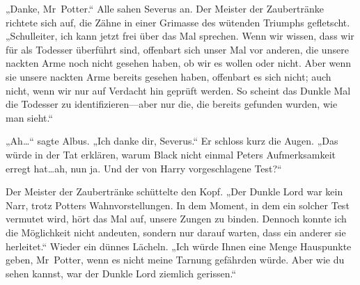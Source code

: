 „Danke, Mr~Potter.“ Alle sahen Severus an. Der Meister der Zaubertränke richtete sich auf, die Zähne in einer Grimasse des wütenden Triumphs gefletscht. „Schulleiter, ich kann jetzt frei über das Mal sprechen. Wenn wir wissen, dass wir für als Todesser überführt sind, offenbart sich unser Mal vor anderen, die unsere nackten Arme noch nicht gesehen haben, ob wir es wollen oder nicht. Aber wenn sie unsere nackten Arme bereits gesehen haben, offenbart es sich nicht; auch nicht, wenn wir nur auf Verdacht hin geprüft werden. So scheint das Dunkle Mal die Todesser zu identifizieren—aber nur die, die bereits gefunden wurden, wie man sieht.“

„Ah…“ sagte Albus. „Ich danke dir, Severus.“ Er schloss kurz die Augen. „Das würde in der Tat erklären, warum Black nicht einmal Peters Aufmerksamkeit erregt hat…ah, nun ja. Und der von Harry vorgeschlagene Test?“

Der Meister der Zaubertränke schüttelte den Kopf. „Der Dunkle Lord war kein Narr, trotz Potters Wahnvorstellungen. In dem Moment, in dem ein solcher Test vermutet wird, hört das Mal auf, unsere Zungen zu binden. Dennoch konnte ich die Möglichkeit nicht andeuten, sondern nur darauf warten, dass ein anderer sie herleitet.“ Wieder ein dünnes Lächeln. „Ich würde Ihnen eine Menge Hauspunkte geben, Mr~Potter, wenn es nicht meine Tarnung gefährden würde. Aber wie du sehen kannst, war der Dunkle Lord ziemlich gerissen.“

